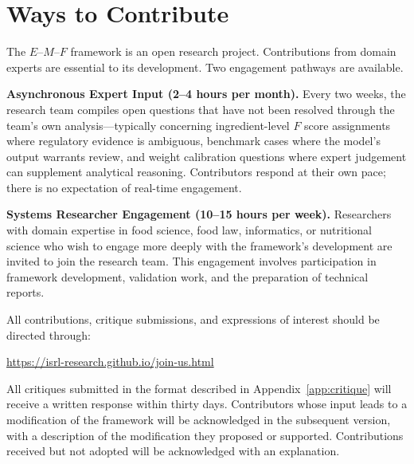 \documentclass[12pt,a3paper]{article}
\begin{document}
\newpage

\section{Ways to Contribute}
\label{app:contribute}

The $E$--$M$--$F$ framework is an open research project. Contributions from domain experts are essential to its development. Two engagement pathways are available.

\textbf{Asynchronous Expert Input (2--4 hours per month).} Every two weeks, the research team compiles open questions that have not been resolved through the team's own analysis---typically concerning ingredient-level $F$ score assignments where regulatory evidence is ambiguous, benchmark cases where the model's output warrants review, and weight calibration questions where expert judgement can supplement analytical reasoning. Contributors respond at their own pace; there is no expectation of real-time engagement.

\textbf{Systems Researcher Engagement (10--15 hours per week).} Researchers with domain expertise in food science, food law, informatics, or nutritional science who wish to engage more deeply with the framework's development are invited to join the research team. This engagement involves participation in framework development, validation work, and the preparation of technical reports.

All contributions, critique submissions, and expressions of interest should be directed through:
\begin{center}
\url{https://isrl-research.github.io/join-us.html}
\end{center}

All critiques submitted in the format described in Appendix~\ref{app:critique} will receive a written response within thirty days. Contributors whose input leads to a modification of the framework will be acknowledged in the subsequent version, with a description of the modification they proposed or supported. Contributions received but not adopted will be acknowledged with an explanation.

\newpage



\end{document}
